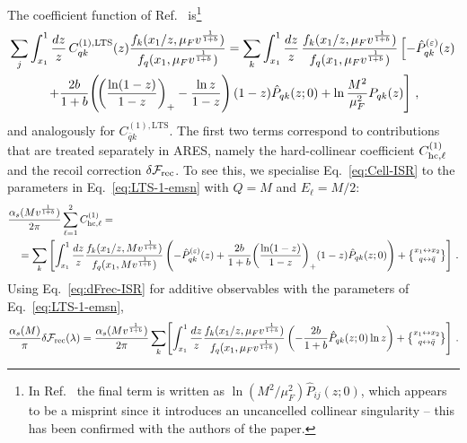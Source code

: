 The coefficient function of Ref.~\cite{vanBeekveld:2025zjh}
is\footnote{In Ref.~\cite{vanBeekveld:2025zjh} the final term is
written as $\ln(M^2/\mu_F^2)\hat{P}_{ij}(z;0)$, which appears to be
a misprint since it introduces an uncancelled collinear singularity --
this has been confirmed with the authors of the paper.}
\begin{multline}
  \label{eq:CkiLTS}
  \sum_j\int_{x_1}^1\frac{dz}{z}\,C_{qk}^{(1),\rm LTS}(z)
  \frac{f_k(x_1/z,\mu_F v^{\frac{1}{1+b}})}
  {f_q(x_1,\mu_F v^{\frac{1}{1+b}})}   = \sum_k\int_{x_1}^1\frac{dz}{z}\,
  \frac{f_k(x_1/z,\mu_F v^{\frac{1}{1+b}})}
  {f_q(x_1,\mu_F v^{\frac{1}{1+b}})}
  \left[-\hat{P}_{qk}^{(\varepsilon)}(z)\right.\\
  \left.+\frac{2b}{1+b}\!\left(\!
  \left(\frac{\ln(1-z)}{1-z}\right)_+
  -\frac{\ln z}{1-z}\right)
  (1-z)\hat{P}_{qk}(z;0)
  +\ln\frac{M^2}{\mu_F^2}P_{qk}(z)\right]\,,
\end{multline}
and analogously for $C_{\bar{q}k}^{(1),\mathrm{LTS}}$.
The first two terms correspond to contributions that are treated
separately in \textsc{ARES}, namely the hard-collinear coefficient
$C_{{\rm hc},\ell}^{(1)}$ and the recoil correction
$\delta\mathcal{F}_{\rm rec}$. To see this, we
specialise Eq.~\eqref{eq:Cell-ISR} to the parameters in
Eq.~\eqref{eq:LTS-1-emsn} with $Q=M$ and $E_\ell=M/2$:
\begin{equation}
\begin{aligned}
  \label{eq:Cij-LTS-comp}
  &\frac{\alpha_s(Mv^{\frac{1}{1+b}})}{2\pi}\sum_{\ell=1}^2
  C_{{\rm hc},\ell}^{(1)} =\\
  &\quad=\sum_k\left[\int_{x_1}^1\frac{dz}{z}
  \frac{f_k(x_1/z,Mv^{\frac{1}{1+b}})}
  {f_q(x_1,Mv^{\frac{1}{1+b}})}
  \left(-\hat{P}_{qk}^{(\varepsilon)}(z)
  +\frac{2b}{1+b}
  \!\left(\frac{\ln(1-z)}{1-z}\right)_+\!(1-z)\hat{P}_{qk}(z;0)
  \right)  +\left\{\substack{x_1\leftrightarrow x_2\\[0.5ex] q\leftrightarrow\bar{q}}\right\}\right]\,.
\end{aligned}
\end{equation}
Using Eq.~\eqref{eq:dFrec-ISR} for additive observables with the
parameters of Eq.~\eqref{eq:LTS-1-emsn},
\begin{equation}
  \label{eq:dFrec-LTS-comp}
  \frac{\alpha_s(M)}{\pi}\delta\mathcal{F}_{\rm rec}(\lambda) =
  \frac{\alpha_s(Mv^{\frac{1}{1+b}})}{2\pi}
  \sum_k\!\left[\int_{x_1}^1\frac{dz}{z}
  \frac{f_k(x_1/z,\mu_F v^{\frac{1}{1+b}})}
  {f_q(x_1,\mu_F v^{\frac{1}{1+b}})}
  \left(-\frac{2b}{1+b}\hat{P}_{qk}(z;0)\ln z\right)
  +\left\{\substack{x_1\leftrightarrow x_2\\[0.5ex] q\leftrightarrow\bar{q}}\right\}\right]\,.
\end{equation}
